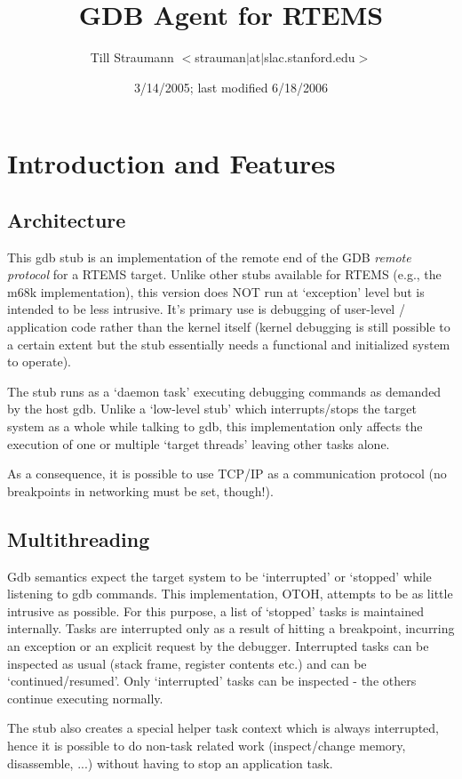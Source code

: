\documentclass{article}
\title{GDB Agent for RTEMS}
\author{Till Straumann $<$strauman$|$at$|$slac.stanford.edu$>$}
\date{3/14/2005; last modified 6/18/2006\\
\nix
}
\begin{document}
\maketitle
\tableofcontents

\section{Introduction and Features}

\subsection{Architecture}

This gdb stub is an implementation of the remote end of the
GDB {\em remote protocol} for a RTEMS target. Unlike other stubs
available for RTEMS (e.g., the m68k implementation), this
version does NOT run at `exception' level but is intended to
be less intrusive. It's primary use is debugging of user-level
/ application code rather than the kernel itself (kernel
debugging is still possible to a certain extent but the stub
essentially needs a functional and initialized system to
operate).

The stub runs as a `daemon task' executing debugging commands
as demanded by the host gdb. Unlike a `low-level stub' which
interrupts/stops the target system as a whole while talking
to gdb, this implementation only affects the execution of
one or multiple `target threads' leaving other tasks alone.

As a consequence, it is possible to use TCP/IP as a communication
protocol (no breakpoints in networking must be set, though!).

\subsection{Multithreading}
Gdb semantics expect the target system to be `interrupted' or
`stopped' while listening to gdb commands. This implementation,
OTOH, attempts to be as little intrusive as possible. For this
purpose, a list of `stopped' tasks is maintained internally.
Tasks are interrupted only as a result of hitting a breakpoint,
incurring an exception or an explicit request by the debugger.
Interrupted tasks can be inspected as usual (stack frame,
register contents etc.) and can be `continued/resumed'.
Only `interrupted' tasks can be inspected - the others continue
executing normally.

The stub also creates a special helper task context which is
always interrupted, hence it is possible to do non-task related
work (inspect/change memory, disassemble, ...) without having
to stop an application task.
\end{document}
